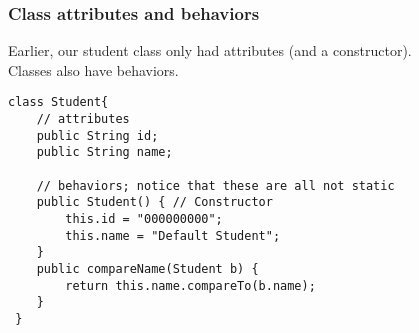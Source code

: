 \documentclass[aspectratio=169]{beamer}
\begin{document}
\begin{frame}[fragile]
\frametitle{Class attributes and behaviors}
Earlier, our student class only had attributes (and a constructor).\\
Classes also have behaviors.
\begin{example}
\begin{lstlisting}
class Student{
    // attributes
    public String id;
    public String name;

    // behaviors; notice that these are all not static
    public Student() { // Constructor
        this.id = "000000000";
        this.name = "Default Student";
    }
    public compareName(Student b) {
        return this.name.compareTo(b.name);
    }
 }
\end{lstlisting}
\end{example}
\end{frame}
\end{document}
